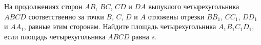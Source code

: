 \begin{ex}
	\begin{condition}
		На продолжениях сторон \( AB \), \( BC \), \( CD  \) и \( DA  \) выпуклого четырехугольника \( ABCD  \) соответственно за точки \( B \), \( C \), \( D  \) и \( A  \) отложены отрезки \( BB_1 \), \( CC_1 \), \( DD_1 \) и \( AA_1 \), равные этим сторонам. Найдите площадь четырехугольника \( A_1B_1C_1D_1 \), если площадь четырехугольника \( ABCD  \) равна \( s \).
	\end{condition}
\end{ex}